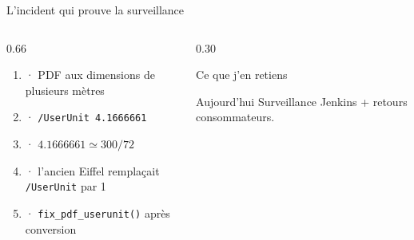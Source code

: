 \begin{frame}{L'incident qui prouve la surveillance}
\begin{columns}[T]
\begin{column}{0.66\linewidth}
\small
\begin{enumerate}
  \item {} · PDF aux dimensions de plusieurs mètres
  \item {} · \texttt{/UserUnit 4.1666661}
  \item {} · $4.1666661 \simeq 300/72$
  \item {} · l'ancien Eiffel remplaçait \texttt{/UserUnit} par 1
  \item {} · \texttt{fix\_pdf\_userunit()} après conversion
\end{enumerate}
\end{column}
\begin{column}{0.30\linewidth}
\begin{block}{Ce que j'en retiens}
\small{}
\end{block}
\vspace{0.35em}
\begin{block}{Aujourd'hui}
\small Surveillance Jenkins + retours consommateurs. 
\end{block}
\end{column}
\end{columns}
\end{frame}

